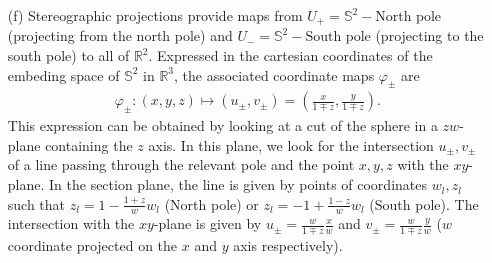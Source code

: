 \documentclass[10pt, a4paper]{article}
\begin{document}
{\begin{enumerate}
  \item[(f)] Stereographic projections provide maps from $U_{+} = \mathbb{S}^2-\text{North pole}$ (projecting from the north pole) and $U_{-} = \mathbb{S}^2-\text{South pole}$ (projecting to the south pole) to all of $\mathbb{R}^2$. Expressed in the cartesian coordinates of the embeding space of $\mathbb{S}^2$ in $\mathbb{R}^3$, the associated coordinate maps $\varphi_{\pm}$ are 
  \begin{align*}
    \varphi_\pm : (x, y, z) \mapsto (u_\pm, v_\pm) = \left(\frac{x}{1\mp z}, \frac{y}{1\mp z}\right).
  \end{align*} 
  This expression can be obtained by looking at a cut of the sphere in a $zw$-plane containing the $z$ axis. In this plane, we look for the intersection $u_\pm, v_\pm$ of a line passing through the relevant pole and the point $x, y, z$ with the $xy$-plane. In the section plane, the line is given by points of coordinates $w_l, z_l$ such that $z_l = 1 - \frac{1+z}{w}w_l$ (North pole) or $z_l = -1 + \frac{1-z}{w} w_l$ (South pole). The intersection with the $xy$-plane is given by $u_\pm =\frac{w}{1\mp z} \frac{x}{w}$ and $v_\pm = \frac{w}{1\mp z} \frac{y}{w}$ ($w$ coordinate projected on the $x$ and $y$ axis respectively).


\end{enumerate}}
\end{document}
